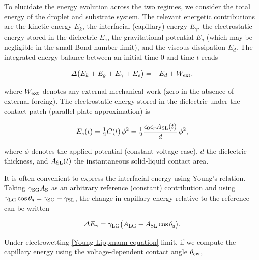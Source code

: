 \documentclass[lineno]{cls/jfm}
\begin{document}



To elucidate the energy evolution across the two regimes, we consider the total energy of the droplet and substrate system. The relevant energetic contributions are the kinetic energy $E_k$, the interfacial (capillary) energy $E_\gamma$, the electrostatic energy stored in the dielectric $E_e$, the gravitational potential $E_g$ (which may be negligible in the small-Bond-number limit), and the viscous dissipation $E_d$. The integrated energy balance between an initial time $0$ and time $t$ reads

\begin{equation}
  \Delta\big( E_k + E_g + E_\gamma + E_e \big) = - E_d + W_{\rm ext}.
  \label{eq:energy_general}
\end{equation}

\noindent where \(W_{\rm ext}\) denotes any external mechanical work (zero in the absence of external forcing). The electrostatic energy stored in the dielectric under the contact patch (parallel-plate approximation) is

\begin{equation}
  E_e(t)=\tfrac{1}{2}C(t)\,\phi^2
  = \tfrac{1}{2}\frac{\epsilon_0\epsilon_r A_{\rm SL}(t)}{d}\,\phi^2,
  \label{eq:Eelec}
\end{equation}

\noindent where $\phi$ denotes the applied potential (constant-voltage case), $d$ the dielectric thickness, and $A_{\rm SL}(t)$ the instantaneous solid-liquid contact area.

It is often convenient to express the interfacial energy using Young's relation. Taking $\gamma_{\rm SG} A_{\rm S}$ as an arbitrary reference (constant) contribution and using
$\gamma_{\rm LG}\cos\theta_{\rm s}=\gamma_{\rm SG}-\gamma_{\rm SL}$, the change in capillary energy relative to the reference can be written

\begin{equation}
  \Delta E_\gamma = \gamma_{\rm LG}\big( A_{\rm LG} - A_{\rm SL}\cos\theta_{\rm s}\big).
  \label{eq:DeltaEgamma}
\end{equation}

\noindent Under electrowetting \ref{Young-Lippmann equation} limit, if we compute the capillary energy using the voltage-dependent contact angle $\theta_{\rm ew}$,
\end{document}
